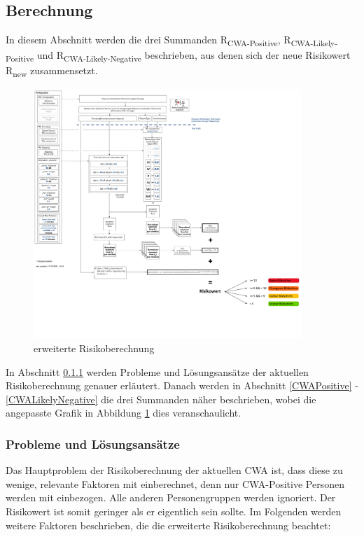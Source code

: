 \documentclass[conference,compsoc]{IEEEtran}
\begin{document}
\subsection{Berechnung}
\label{Berechnung}

In diesem Abschnitt werden die drei Summanden R\textsubscript{CWA-Positive}, R\textsubscript{CWA-Likely-Positive} und R\textsubscript{CWA-Likely-Negative} beschrieben, aus denen sich der neue Risikowert R\textsubscript{new} zusammensetzt.

\begin{figure}[h]
	\centering
	\includegraphics[width=0.9\textwidth]{"RiskCalculation"}
	\caption{erweiterte Risikoberechnung}
	\label{ErweiterteRisikoberechnung_Abbildung}
\end{figure}

In Abschnitt \ref{Probleme_und_Loesungsansaetze_Risikoberechnung} werden Probleme und Lösungsansätze der aktuellen Risikoberechnung genauer erläutert.
Danach werden in Abschnitt \ref{CWAPositive} - \ref{CWALikelyNegative} die drei Summanden näher beschrieben, wobei die angepasste Grafik in Abbildung \ref{ErweiterteRisikoberechnung_Abbildung} dies veranschaulicht.

\subsubsection{Probleme und Lösungsansätze}
\label{Probleme_und_Loesungsansaetze_Risikoberechnung}

Das Hauptproblem der Risikoberechnung der aktuellen CWA ist, dass diese zu wenige, relevante Faktoren mit einberechnet, denn nur CWA-Positive Personen werden mit einbezogen.
Alle anderen Personengruppen werden ignoriert. Der Risikowert ist somit geringer als er eigentlich sein sollte. Im Folgenden werden weitere Faktoren beschrieben, die die erweiterte Risikoberechnung beachtet:
\end{document}
